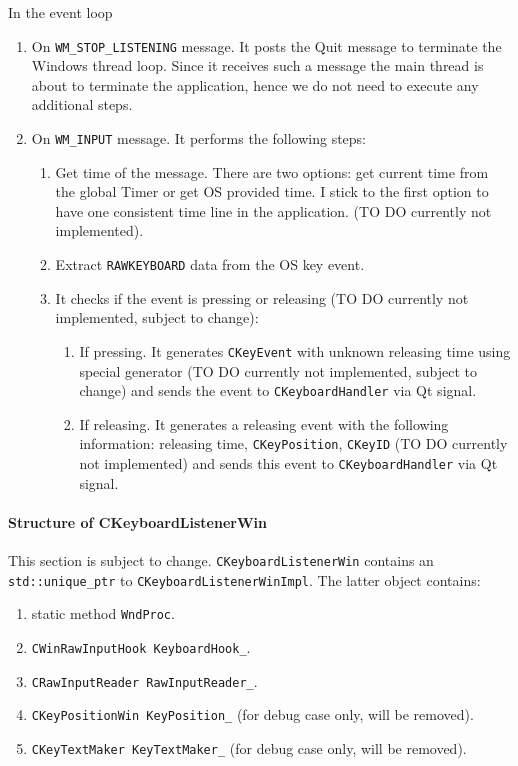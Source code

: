 \documentclass{article}
\begin{document}
In the event loop
\begin{enumerate}
\item On \verb"WM_STOP_LISTENING" message. It posts the Quit message to terminate the Windows thread loop. Since it receives such a message the main thread is about to terminate the application, hence we do not need to execute any additional steps.

\item On \verb"WM_INPUT" message. It performs the following steps:
\begin{enumerate}
\item Get time of the message. There are two options: get current time from the global Timer or get OS provided time. I stick to the first option to have one consistent time line in the application. (TO DO currently not implemented).

\item Extract \verb"RAWKEYBOARD" data from the OS key event.

\item It checks if the event is pressing or releasing (TO DO currently not implemented, subject to change):
\begin{enumerate}
\item If pressing. It generates \verb"CKeyEvent" with unknown releasing time using special generator (TO DO currently not implemented, subject to change) and sends the event to \verb"CKeyboardHandler" via Qt signal.

\item If releasing. It generates a releasing event with the following information: releasing time, \verb"CKeyPosition", \verb"CKeyID" (TO DO currently not implemented) and sends this event to \verb"CKeyboardHandler" via Qt signal.

\end{enumerate}
\end{enumerate}
\end{enumerate}


\paragraph{Structure of CKeyboardListenerWin}

This section is subject to change.
\verb"CKeyboardListenerWin" contains an \verb"std::unique_ptr" to \verb"CKeyboardListenerWinImpl". The latter object contains:
\begin{enumerate}
\item static method \verb"WndProc".
\item \verb"CWinRawInputHook KeyboardHook_".
\item \verb"CRawInputReader RawInputReader_".
\item \verb"CKeyPositionWin KeyPosition_" (for debug case only, will be removed).
\item \verb"CKeyTextMaker KeyTextMaker_" (for debug case only, will be removed).
\end{enumerate}
\end{document}
